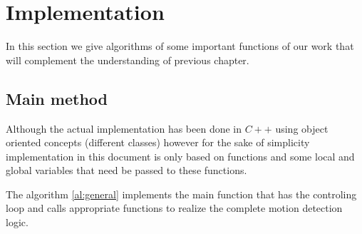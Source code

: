 \section{Implementation}

In this section we give algorithms of some important functions of our work that will complement the understanding of previous chapter.

\subsection{Main method}
Although the actual implementation has been done in $C++$ using object oriented concepts (different classes) however for the sake of simplicity implementation in this document is only based on functions and some local and global variables that need be passed to these functions.

The algorithm \ref{al:general} implements the main function that has the controling loop and calls appropriate functions to realize the complete motion detection logic.


